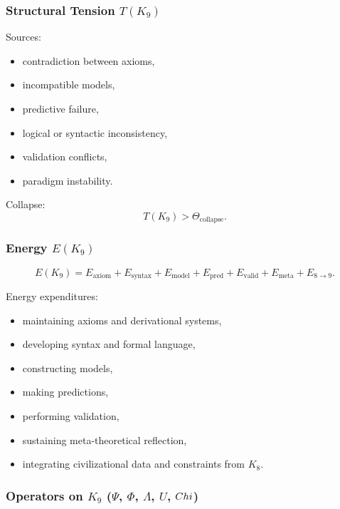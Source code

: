 \subsubsection{Structural Tension \texorpdfstring{$T(K_9)$}{T(K_9)}}

Sources:
\begin{itemize}
    \item contradiction between axioms,
    \item incompatible models,
    \item predictive failure,
    \item logical or syntactic inconsistency,
    \item validation conflicts,
    \item paradigm instability.
\end{itemize}

Collapse:
\[
T(K_9) > \Theta_{\mathrm{collapse}}.
\]

\subsubsection{Energy \texorpdfstring{$E(K_9)$}{E(K_9)}}

\[
E(K_9)=
E_{\mathrm{axiom}}+
E_{\mathrm{syntax}}+
E_{\mathrm{model}}+
E_{\mathrm{pred}}+
E_{\mathrm{valid}}+
E_{\mathrm{meta}}+
E_{8\to9}.
\]

Energy expenditures:
\begin{itemize}
    \item maintaining axioms and derivational systems,
    \item developing syntax and formal language,
    \item constructing models,
    \item making predictions,
    \item performing validation,
    \item sustaining meta-theoretical reflection,
    \item integrating civilizational data and constraints from $K_8$.
\end{itemize}

\subsubsection{Operators on \texorpdfstring{$K_9$}{K_9} (\texorpdfstring{$\Psi$}{\Psi}, \texorpdfstring{$\Phi$}{\Phi}, \texorpdfstring{$\Lambda$}{\Lambda}, \texorpdfstring{$U$}{U}, \texorpdfstring{$Chi$}{\Chi})}

